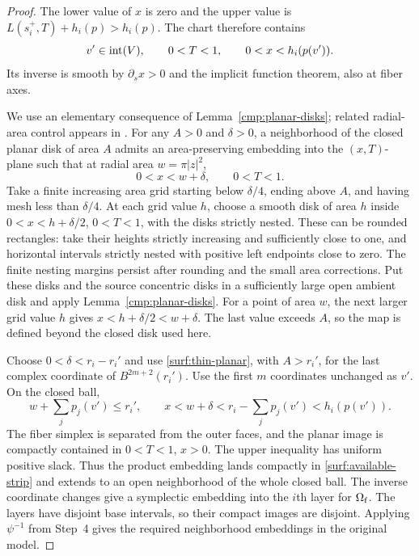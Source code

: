 \begin{proof}
The lower value of $x$ is zero and the upper value is
$L(s_i^+,T)+h_i(p)>h_i(p)$.  The chart therefore contains
\begin{equation}\label{surf:available-strip}
       v'\in\operatorname{int}(V),\qquad 0<T<1,\qquad 0<x<h_i(p(v')).
\end{equation}
Its inverse is smooth by $\partial_sx>0$ and the implicit
function theorem, also at fiber axes.

We use an elementary consequence of Lemma~\ref{cmp:planar-disks};
related radial-area control appears in
\cite[Section~3.1, Lemma~3.2]{SchlenkHand}.
For any $A>0$ and $\delta>0$, a neighborhood of the closed planar
disk of area $A$ admits an area-preserving embedding into the
$(x,T)$-plane such that at radial area $w=\pi|z|^2$,
\begin{equation}\label{surf:thin-planar}
                   0<x<w+\delta,\qquad 0<T<1.
\end{equation}
Take a finite increasing area grid starting below $\delta/4$,
ending above $A$, and having mesh less than $\delta/4$.
At each grid value $h$, choose a smooth disk of area $h$ inside
$0<x<h+\delta/2$, $0<T<1$, with the disks strictly nested.
These can be rounded rectangles: take their heights strictly
increasing and sufficiently close to one, and horizontal
intervals strictly nested with positive left endpoints close
to zero.  The finite nesting margins persist after rounding
and the small area corrections.  Put these disks and the source
concentric disks in a sufficiently large open ambient disk and
apply Lemma~\ref{cmp:planar-disks}.  For a point of area $w$,
the next larger grid value $h$ gives
$x<h+\delta/2<w+\delta$.  The last value exceeds $A$, so the
map is defined beyond the closed disk used here.

Choose $0<\delta<r_i-r_i'$ and use \eqref{surf:thin-planar},
with $A>r_i'$, for the last complex coordinate of
$B^{2m+2}(r_i')$.  Use the first $m$ coordinates unchanged as $v'$.
On the closed ball,
\[
       w+\sum_jp_j(v')\leq r_i',
       \qquad
       x<w+\delta<r_i-\sum_jp_j(v')<h_i(p(v')).
\]
The fiber simplex is separated from the outer faces, and the planar
image is compactly contained in $0<T<1$, $x>0$.  The upper
inequality has uniform positive slack.  Thus the product embedding
lands compactly in \eqref{surf:available-strip} and extends to an
open neighborhood of the whole closed ball.  The inverse coordinate
changes give a symplectic embedding into the $i$th layer for
$\Omega_{\rm f}$.  The layers have disjoint base intervals, so
their compact images are disjoint.  Applying $\psi^{-1}$ from
Step~4 gives the required neighborhood embeddings in the original
model.
\end{proof}

